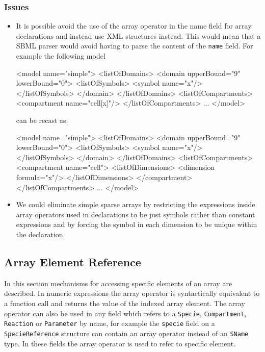\documentclass{cekarticle}
\begin{document}
\subsubsection{Issues}
\begin{itemize}
\item
It is possible avoid the use of the array operator in the name
field for array declarations and instead use XML structures
instead.  This would mean that a SBML parser would avoid having
to parse the content of the \texttt{name} field.  For example the
following model
\begin{example}
<model name="simple">
    <listOfDomains>
        <domain upperBound="9" lowerBound="0">
            <listOfSymbols>
                <symbol name="x"/>
            </listOfSymbols>
        </domain>
    </listOfDomains>
    <listOfCompartments>
        <compartment name="cell[x]"/>
    </listOfCompartments>
    ...
</model>
\end{example}
can be recast as:
\begin{example}
<model name="simple">
    <listOfDomains>
        <domain upperBound="9" lowerBound="0">
            <listOfSymbols>
                <symbol name="x"/>
            </listOfSymbols>
        </domain>
    </listOfDomains>
    <listOfCompartments>
        <compartment name="cell">
            <listOfDimensions>
                <dimension formula="x"/>
            </listOfDimensions>
        </compartment>
    </listOfCompartments>
    ...
</model>
\end{example}

\item
We could eliminate simple sparse arrays by restricting the
expressions inside array operators used in declarations to be
just symbols rather than constant expressions and by forcing the
symbol in each dimension to be unique within the declaration.
\end{itemize}

\subsection{Array Element Reference}
In this section mechanisms for accessing specific elements of an
array are described. In numeric expressions the array operator is
syntactically equivalent to a function call and returns the value
of the indexed array element. The array operator can also be used
in any field which refers to a \texttt{Specie},
\texttt{Compartment}, \texttt{Reaction} or \texttt{Parameter} by
name, for example the \texttt{specie} field on a
\texttt{SpecieReference} structure can contain an array operator
instead of an \texttt{SName} type.  In these fields the array
operator is used to refer to specific element.
\end{document}
